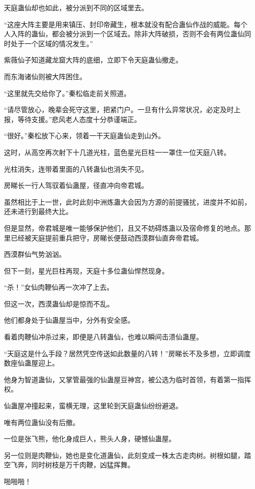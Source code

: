 \begin{this_body}
天庭蛊仙却也如此，被分派到不同的区域里去。

“这座大阵主要是用来镇压、封印帝藏生，根本就没有配合蛊仙作战的威能。每个人入阵的蛊仙，都会被分派到一个区域去。除非大阵破损，否则不会有两位蛊仙同时处于一个区域的情况发生。”

紫薇仙子知道藏龙窟大阵的底细，立即下令天庭蛊仙撤走。

而东海诸仙则被大阵困住。

“这里就先交给你了。”秦松临走前关照道。

“请尽管放心，晚辈会死守这里，把紧门户。一旦有什么异常状况，必定及时上报，等待支援。”悲风老人态度十分恭谨端正。

“很好。”秦松放下心来，领着一干天庭蛊仙走到山外。

这时，从高空再次射下十几道光柱，蓝色星光巨柱一一罩住一位天庭八转。

光柱消失，连带着里面的八转蛊仙也消失不见。

房睇长一行人驾驭着仙蛊屋，径直冲向帝君城。

虽然相比于上一世，此时此刻中洲炼蛊大会因为方源的前提骚扰，进度并不如前，还未进行到最终大比。

但是显然，帝君城是唯一能够保护他们，且又不妨碍炼蛊以及宿命修复的地点。那里已经被天庭提前重兵把守，房睇长便鼓动西漠群仙直奔帝君城。

西漠群仙气势汹汹。

但下一刻，星光巨柱再现，天庭十多位蛊仙悍然现身。

“杀！”女仙肉鞭仙再一次冲了上去。

但这一次，西漠蛊仙却是惊而不乱。

他们都身处于仙蛊屋当中，分外有安全感。

看着肉鞭仙冲杀过来，即便是八转蛊仙，也难以瞬间击溃仙蛊屋。

“天庭这是什么手段？居然凭空传送如此数量的八转！”房睇长不及多想，立即调度数座仙蛊屋迎上。

他身为智道蛊仙，又掌管最强的仙蛊屋豆神宫，被公选为临时首领，有着第一指挥权。

仙蛊屋冲撞起来，蛮横无理，这里轮到天庭蛊仙纷纷避退。

唯有两位蛊仙没有后撤。

一位是张飞熊，他化身成巨人，熊头人身，硬憾仙蛊屋。

另一位则是肉鞭仙，她也是变化道蛊仙，此刻变成一株太古走肉树。树根如腿，踏空飞奔，同时树枝是万千肉鞭，凶猛挥舞。

啪啪啪！


\end{this_body}
